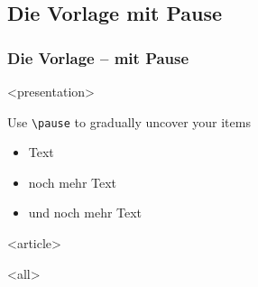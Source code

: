 \subsection{Die Vorlage mit Pause}
{%
\begin{frame}[fragile,t]
\frametitle<presentation>{Die Vorlage -- mit Pause}



\mode
<presentation>

	Use \texttt{\textbackslash{}pause} to gradually
	uncover your items

\begin{itemize}
 \item Text
\pause
 \item noch mehr Text
\pause
 \item und noch mehr Text
\end{itemize}


\mode
<article>

\mode
<all>

\end{frame}
}

\newpage
